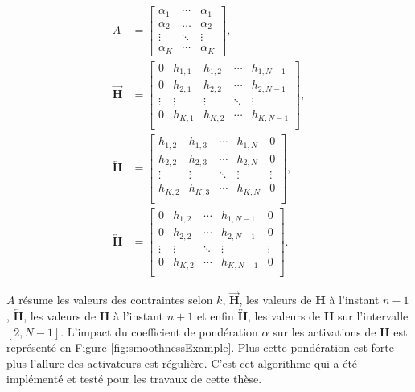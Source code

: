 \begin{subequations}
\begin{align}
    A &=
\begin{bmatrix}
\alpha_1 &  \cdots & \alpha_1  \\
\alpha_2 & \dots & \alpha_2  \\
\vdots & \ddots &  \vdots \\
\alpha_K & \cdots & \alpha_K
\end{bmatrix}, \label{eq:subeq1}\\
    \overrightarrow{\mathbf{H}} &=
\begin{bmatrix}
0 & h_{1,1} & h_{1,2} & \cdots & h_{1,N-1}\\
0 & h_{2,1} & h_{2,2} & \cdots & h_{2,N-1}\\
\vdots & \vdots & \vdots & \ddots & \vdots\\
0 & h_{K,1} & h_{K,2} & \cdots & h_{K,N-1}\\
\end{bmatrix}, \label{eq:subeq2}\\
    \overleftarrow{\mathbf{H}} &=
\begin{bmatrix}
h_{1,2} & h_{1,3} & \cdots & h_{1,N} & 0\\
h_{2,2} & h_{2,3} & \cdots & h_{2,N} & 0\\
\vdots & \vdots & \ddots & \vdots & \vdots\\
h_{K,2} & h_{K,3} & \cdots & h_{K,N} & 0\\
\end{bmatrix}, \label{eq:subeq3}\\
    \overleftrightarrow{\mathbf{H}} &=
\begin{bmatrix}
0 & h_{1,2} & \cdots & h_{1,N-1} & 0\\
0 & h_{2,2} & \cdots & h_{2,N-1} & 0\\
\vdots & \vdots & \ddots & \vdots & \vdots\\
0 & h_{K,2} & \cdots & h_{K,N-1} & 0\\
\end{bmatrix}. \label{eq:subeq5}
\end{align}
\end{subequations}

$A$ résume les valeurs des contraintes selon $k$, $\overrightarrow{\mathbf{H}}$, les valeurs de $\mathbf{H}$ à l'instant $n-1$, $\overleftarrow{\mathbf{H}}$, les valeurs de $\mathbf{H}$ à l'instant $n+1$ et enfin $\overleftrightarrow{\mathbf{H}}$, les valeurs de $\mathbf{H}$ sur l'intervalle $\left[2,N-1 \right]$. L'impact du coefficient de pondération $\alpha$ sur les activations de $\mathbf{H}$ est représenté en Figure \ref{fig:smoothnessExample}. Plus cette pondération est forte plus l'allure des activateurs est régulière. C'est cet algorithme qui a été implémenté et testé pour les travaux de cette thèse.

